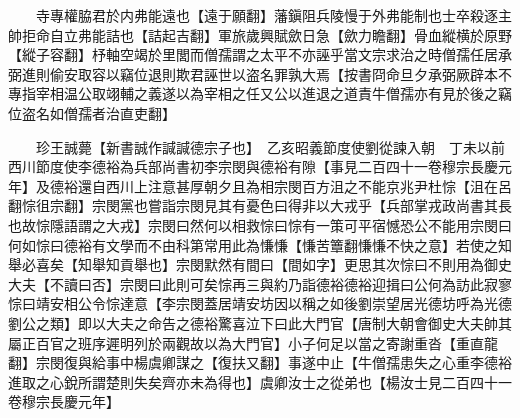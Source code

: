 　　寺專權脇君於内弗能遠也【遠于願翻】藩鎭阻兵陵慢于外弗能制也士卒殺逐主帥拒命自立弗能詰也【詰起吉翻】軍旅歲興賦歛日急【歛力瞻翻】骨血縱横於原野【縱子容翻】杼軸空竭於里閭而僧孺謂之太平不亦誣乎當文宗求治之時僧孺任居承弼進則偷安取容以竊位退則欺君誣世以盗名罪孰大焉【按書冏命旦夕承弼厥辟本不專指宰相温公取翊輔之義遂以為宰相之任又公以進退之道責牛僧孺亦有見於後之竊位盗名如僧孺者治直吏翻】

　　珍王誠薨【新書誠作諴諴德宗子也】　乙亥昭義節度使劉從諫入朝　丁未以前西川節度使李德裕為兵部尚書初李宗閔與德裕有隙【事見二百四十一卷穆宗長慶元年】及德裕還自西川上注意甚厚朝夕且為相宗閔百方沮之不能京兆尹杜悰【沮在呂翻悰徂宗翻】宗閔黨也嘗詣宗閔見其有憂色曰得非以大戎乎【兵部掌戎政尚書其長也故悰隱語謂之大戎】宗閔曰然何以相救悰曰悰有一策可平宿憾恐公不能用宗閔曰何如悰曰德裕有文學而不由科第常用此為慊慊【慊苦簟翻慊慊不快之意】若使之知舉必喜矣【知舉知貢舉也】宗閔默然有間曰【間如字】更思其次悰曰不則用為御史大夫【不讀曰否】宗閔曰此則可矣悰再三與約乃詣德裕德裕迎揖曰公何為訪此寂寥悰曰靖安相公令悰達意【李宗閔蓋居靖安坊因以稱之如後劉崇望居光德坊呼為光德劉公之類】即以大夫之命告之德裕驚喜泣下曰此大門官【唐制大朝會御史大夫帥其屬正百官之班序遲明列於兩觀故以為大門官】小子何足以當之寄謝重沓【重直龍翻】宗閔復與給事中楊虞卿謀之【復扶又翻】事遂中止【牛僧孺患失之心重李德裕進取之心銳所謂楚則失矣齊亦未為得也】虞卿汝士之從弟也【楊汝士見二百四十一卷穆宗長慶元年】

